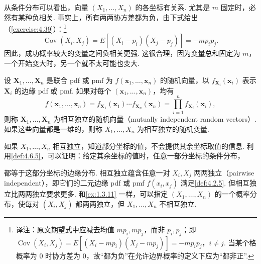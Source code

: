 从条件分布可以看出，向量 $(X_1,\ldots,X_n)$ 的各坐标有关系. 尤其是 $m$ 固定时，必然有某种负相关. 事实上，所有两两协方差都为负，由下式给出（\autoref{exercise:4.39}）：\footnote{译注：原文期望式中应减去均值 $mp_i,mp_j$，而非 $p_i,p_j$；即 $\operatorname{Cov}(X_i,X_j)=E[(X_i-mp_i)(X_j-mp_j)]=-mp_ip_j$，$i\ne j$. 当某个格概率为 0 时协方差为 0，故“都为负”在允许边界概率的定义下应为“都非正”.}
$$\operatorname{Cov}(X_i,X_j)=E[(X_i-p_i)(X_j-p_j)]=-mp_ip_j.$$
因此，成功概率较大的变量之间负相关更强. 这很合理，因为变量总和固定为 $m$，一个开始变大时，另一个就不太可能也变大.
\begin{definition}\label{def:4.6.5}
设 $\mathbf X_1,\ldots,\mathbf X_n$ 是联合 pdf 或 pmf 为 $f(\mathbf x_1,\ldots,\mathbf x_n)$ 的随机向量，以 $f_{\mathbf X_i}(\mathbf x_i)$ 表示 $\mathbf X_i$ 的边缘 pdf 或 pmf. 如果对每个 $(\mathbf x_1,\ldots,\mathbf x_n)$，均有
$$f(\mathbf x_1,\ldots,\mathbf x_n)=f_{\mathbf X_1}(\mathbf x_1)\cdots f_{\mathbf X_n}(\mathbf x_n)=\prod_{i=1}^n f_{\mathbf X_i}(\mathbf x_i),$$
则称 $\mathbf X_1,\ldots,\mathbf X_n$ 为相互独立的随机向量（mutually independent random vectors）. 如果这些向量都是一维的，则称 $X_1,\ldots,X_n$ 为相互独立的随机变量.
\end{definition}
如果 $X_1,\ldots,X_n$ 相互独立，知道部分坐标的值，不会提供其余坐标取值的信息. 利用\autoref{def:4.6.5}，可以证明：给定其余坐标的值时，任意一部分坐标的条件分布，

都等于这部分坐标的边缘分布. 相互独立蕴含任意一对 $X_i,X_j$ 两两独立（pairwise independent），即它们的二元边缘 pdf 或 pmf $f(x_i,x_j)$ 满足\autoref{def:4.2.5}. 但相互独立比两两独立要求更多. 和\autoref{ex:1.3.11} 一样，可以指定 $(X_1,\ldots,X_n)$ 的一个概率分布，使每对 $(X_i,X_j)$ 都两两独立，但 $X_1,\ldots,X_n$ 不相互独立.

